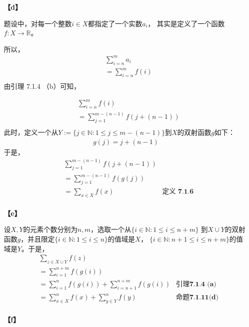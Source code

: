 \documentclass{article}
\theoremstyle{mystyle}
\begin{document}
\textbf{【d】}

题设中，对每一个整数$i \in X$都指定了一个实数$a_i$，
其实是定义了一个函数$f:X \rightarrow \mathbb{R}$。

所以，
\begin{align*}
       & \sum\limits_{i=n}^m a_i   \\
       & =\sum\limits_{i=n}^m f(i) \\
\end{align*}
由引理 7.1.4 （b）可知，

\begin{align*}
       & \sum\limits_{i=n}^m f(i)                 \\
       & = \sum\limits_{j=1}^{m-(n-1)} f(j+(n-1)) \\
\end{align*}
此时，定义一个从$Y := \{j \in \mathbb{N}: 1 \leq j \leq m-(n-1)\}$到$X$的双射函数$g$如下：
\begin{align*}
      g(j) = j+(n-1)
\end{align*}
于是，
\begin{align*}
       & \sum\limits_{j=1}^{m-(n-1)} f(j+(n-1))                     \\
       & =\sum\limits_{j=1}^{m-(n-1)} f(g(j))                       \\
       & =\sum\limits_{x \in X} f(x)            & \textbf{定义 7.1.6} \\
\end{align*}

\textbf{【e】}

设$X,Y$的元素个数分别为$n,m$，选取一个从$\{i \in \mathbb{N}: 1 \leq i \leq n+m\}$
到$X \cup Y$的双射函数$g$，并且限定$\{i \in \mathbb{N}: 1 \leq i \leq n\}$的值域是$X$，
$\{i \in \mathbb{N}: n+1 \leq i \leq n+m\}$的值域是$Y$。于是，
\begin{align*}
       & \sum \limits_{z \in X \cup Y} f(z)                                                           \\
       & = \sum \limits_{i=1}^{n+m} f(g(i))                                                           \\
       & = \sum \limits_{i=1}^{n} f(g(i)) + \sum \limits_{i=n+1}^{n+m} f(g(i)) & \textbf{引理7.1.4 (a)} \\
       & = \sum \limits_{x \in X}^{n} f(x) + \sum \limits_{y \in Y}^{n} f(y)   & \textbf{命题7.1.11(d)} \\
\end{align*}

\textbf{【f】}
\end{document}
